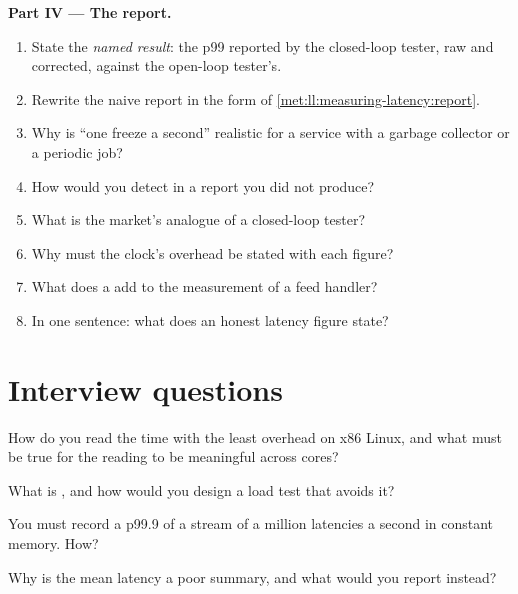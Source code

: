 \begin{problem}
\medskip\noindent\textbf{Part IV --- The report.}
\begin{enumerate}[resume]
\item State the \emph{named result}: the p99 reported by the closed-loop tester, raw and corrected, against the open-loop
tester's.
\item Rewrite the naive report in the form of \cref{met:ll:measuring-latency:report}.
\item Why is ``one freeze a second'' realistic for a service with a garbage collector or a periodic job?
\item How would you detect  in a report you did not produce?
\item What is the market's analogue of a closed-loop tester?
\item Why must the clock's overhead be stated with each figure?
\item What does a  add to the measurement of a feed handler?
\item In one sentence: what does an honest latency figure state?
\end{enumerate}
\end{problem}

\section{Interview questions}

\begin{interviewq}\label{iq:ll:measuring-latency:1}
How do you read the time with the least overhead on x86 Linux, and what must be true for the reading to be meaningful
across cores?
\end{interviewq}

\begin{interviewq}\label{iq:ll:measuring-latency:2}
What is , and how would you design a load test that avoids it?
\end{interviewq}

\begin{interviewq}\label{iq:ll:measuring-latency:3}
You must record a p99.9 of a stream of a million latencies a second in constant memory. How?
\end{interviewq}

\begin{interviewq}\label{iq:ll:measuring-latency:4}
Why is the mean latency a poor summary, and what would you report instead?
\end{interviewq}

